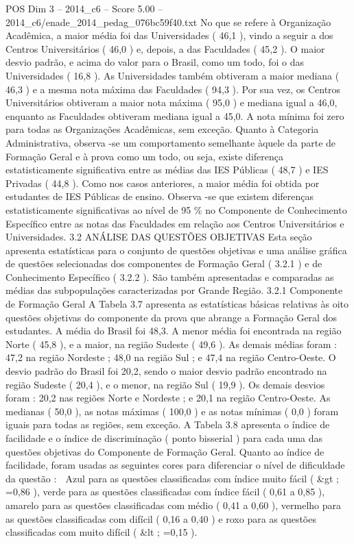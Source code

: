 \begin{textsample}{POS Dim 3 – 2014\_c6 – Score 5.00 – 2014\_c6/enade\_2014\_pedag\_076bc59f40.txt}
No que se refere à Organização Acadêmica, a maior média foi das Universidades ( 46,1 ), vindo a seguir a dos Centros Universitários ( 46,0 ) e, depois, a das Faculdades ( 45,2 ).
O maior desvio padrão, e acima do valor para o Brasil, como um todo, foi o das Universidades ( 16,8 ).
As Universidades também obtiveram a maior mediana ( 46,3 ) e a mesma nota máxima das Faculdades ( 94,3 ).
Por sua vez, os Centros Universitários obtiveram a maior nota máxima ( 95,0 ) e mediana igual a 46,0, enquanto as Faculdades obtiveram mediana igual a 45,0.
A nota mínima foi zero para todas as Organizações Acadêmicas, sem exceção.
Quanto à Categoria Administrativa, observa -se um comportamento semelhante àquele da parte de Formação Geral e à prova como um todo, ou seja, existe diferença estatisticamente significativa entre as médias das IES Públicas ( 48,7 ) e IES Privadas ( 44,8 ).
Como nos casos anteriores, a maior média foi obtida por estudantes de IES Públicas de ensino.
Observa -se que existem diferenças estatisticamente significativas ao nível de 95 \% no Componente de Conhecimento Específico entre as notas das Faculdades em relação aos Centros Universitários e Universidades. 3.2 ANÁLISE DAS QUESTÕES OBJETIVAS Esta seção apresenta estatísticas para o conjunto de questões objetivas e uma análise gráfica de questões selecionadas dos componentes de Formação Geral ( 3.2.1 ) e de Conhecimento Específico ( 3.2.2 ).
São também apresentadas e comparadas as médias das subpopulações caracterizadas por Grande Região. 3.2.1 Componente de Formação Geral A Tabela 3.7 apresenta as estatísticas básicas relativas às oito questões objetivas do componente da prova que abrange a Formação Geral dos estudantes.
A média do Brasil foi 48,3.
A menor média foi encontrada na região Norte ( 45,8 ), e a maior, na região Sudeste ( 49,6 ).
As demais médias foram : 47,2 na região Nordeste ; 48,0 na região Sul ; e 47,4 na região Centro-Oeste.
O desvio padrão do Brasil foi 20,2, sendo o maior desvio padrão encontrado na região Sudeste ( 20,4 ), e o menor, na região Sul ( 19,9 ).
Os demais desvios foram : 20,2 nas regiões Norte e Nordeste ; e 20,1 na região Centro-Oeste.
As medianas ( 50,0 ), as notas máximas ( 100,0 ) e as notas mínimas ( 0,0 ) foram iguais para todas as regiões, sem exceção.
A Tabela 3.8 apresenta o índice de facilidade e o índice de discriminação ( ponto bisserial ) para cada uma das questões objetivas do Componente de Formação Geral.
Quanto ao índice de facilidade, foram usadas as seguintes cores para diferenciar o nível de dificuldade da questão :  Azul para as questões classificadas com índice muito fácil ( \&gt ; =0,86 ), verde para as questões classificadas com índice fácil ( 0,61 a 0,85 ), amarelo para as questões classificadas com médio ( 0,41 a 0,60 ), vermelho para as questões classificadas com difícil ( 0,16 a 0,40 ) e roxo para as questões classificadas com muito difícil ( \&lt ; =0,15 ).

\end{textsample}
